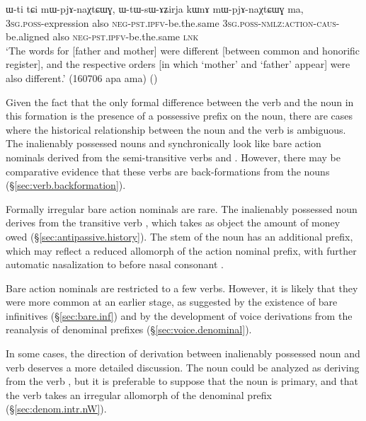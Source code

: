 \begin{exe}
\ex \label{ex:Wti.WtWsAZirja}
\gll  ɯ-ti tɕi mɯ-pjɤ-naχtɕɯɣ, ɯ-tɯ-sɯ-ɤʑirja kɯnɤ mɯ-pjɤ-naχtɕɯɣ ma, \\
\textsc{3sg}.\textsc{poss}-expression also \textsc{neg}-\textsc{pst}.\textsc{ipfv}-be.the.same \textsc{3sg}.\textsc{poss}-\textsc{nmlz}:\textsc{action}-\textsc{caus}-be.aligned also \textsc{neg}-\textsc{pst}.\textsc{ipfv}-be.the.same \textsc{lnk} \\
\glt `The words for [father and mother] were different [between common and honorific register], and the respective orders [in which `mother' and `father' appear] were also different.'  (160706 apa ama)	()
\end{exe}

Given the fact that the only formal difference between the verb and the noun in this formation is the presence of a possessive prefix on the noun, there are cases where the historical relationship between the noun and the verb is ambiguous. The inalienably possessed nouns  and  synchronically look like bare action nominals derived from the semi-transitive verbs  and . However, there may be comparative evidence that these verbs are back-formations from the nouns (§\ref{sec:verb.backformation}).

Formally irregular bare action nominals are rare. The inalienably possessed noun  derives from the transitive verb , which takes as object the amount of money owed (§\ref{sec:antipassive.history}). The stem of the noun has an additional  prefix, which may reflect a reduced allomorph  of the  action nominal prefix, with further automatic nasalization to  before nasal consonant \citep{jacques14antipassive}.

Bare action nominals are restricted to a few verbs. However, it is likely that they were more common at an earlier stage, as suggested by the existence of bare infinitives (§\ref{sec:bare.inf}) and by the development of voice derivations from the reanalysis of denominal prefixes (§\ref{sec:voice.denominal}).

In some cases, the direction of derivation between inalienably possessed noun and verb deserves a more detailed discussion. The noun  could be analyzed as deriving from the verb , but it is preferable to suppose that the noun is primary, and that the verb takes an irregular allomorph of the denominal  prefix (§\ref{sec:denom.intr.nW}).


